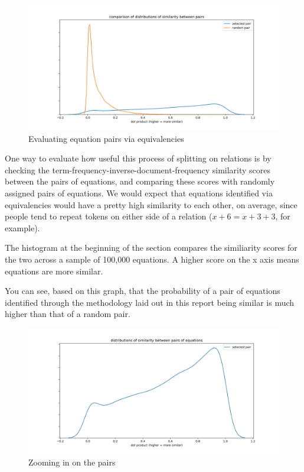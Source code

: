 \documentclass[]{article}
\begin{document}
\begin{figure}
\centering
\includegraphics{pairs_comparison.png}
\caption{Evaluating equation pairs via equivalencies}
\end{figure}

One way to evaluate how useful this process of splitting on relations is
by checking the term-frequency-inverse-document-frequency similarity
scores between the pairs of equations, and comparing these scores with
randomly assigned pairs of equations. We would expect that equations
identified via equivalencies would have a pretty high similarity to each
other, on average, since people tend to repeat tokens on either side of
a relation (\(x + 6 = x + 3 + 3\), for example).

The histogram at the beginning of the section compares the similiarity
scores for the two across a sample of 100,000 equations. A higher score
on the x axis means equations are more similar.

You can see, based on this graph, that the probability of a pair of
equations identified through the methodology laid out in this report
being similar is much higher than that of a random pair.

\begin{figure}
\centering
\includegraphics{pairs_dist.png}
\caption{Zooming in on the pairs}
\end{figure}
\end{document}
